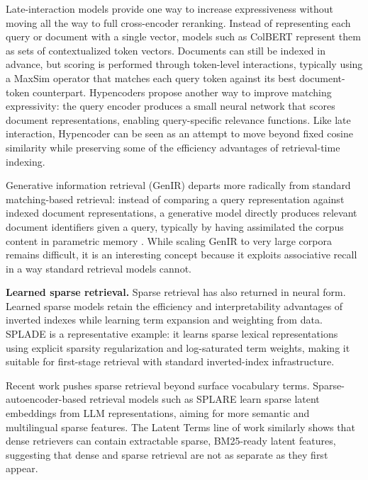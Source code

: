 Late-interaction models provide one way to increase expressiveness without moving all the way to full cross-encoder reranking. Instead of representing each query or document with a single vector, models such as ColBERT  represent them as sets of contextualized token vectors. Documents can still be indexed in advance, but scoring is performed through token-level interactions, typically using a MaxSim operator that matches each query token against its best document-token counterpart.
Hypencoders  propose another way to improve matching expressivity: the query encoder produces a small neural network that scores document representations, enabling query-specific relevance functions. Like late interaction, Hypencoder can be seen as an attempt to move beyond fixed cosine similarity while preserving some of the efficiency advantages of retrieval-time indexing.

Generative information retrieval (GenIR) departs more radically from standard matching-based retrieval: instead of comparing a query representation against indexed document representations, a generative model directly produces relevant document identifiers given a query, typically by having assimilated the corpus content in parametric memory . While scaling GenIR to very large corpora remains difficult, it is an interesting concept because it exploits associative recall in a way standard retrieval models cannot.


\noindent\textbf{Learned sparse retrieval.}
Sparse retrieval has also returned in neural form. Learned sparse models retain the efficiency and interpretability advantages of inverted indexes while learning term expansion and weighting from data. SPLADE  is a representative example: it learns sparse lexical representations using explicit sparsity regularization and log-saturated term weights, making it suitable for first-stage retrieval with standard inverted-index infrastructure.

Recent work pushes sparse retrieval beyond surface vocabulary terms. Sparse-autoencoder-based retrieval models such as SPLARE  learn sparse latent embeddings from LLM representations, aiming for more semantic and multilingual sparse features. The Latent Terms  line of work similarly shows that dense retrievers can contain extractable sparse, BM25-ready latent features, suggesting that dense and sparse retrieval are not as separate as they first appear.


